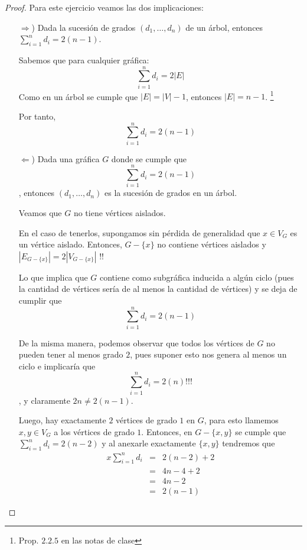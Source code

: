 \documentclass{article}
\begin{document}
\begin{enumerate}
      \renewcommand\qedsymbol{QED}
      \begin{proof}
        Para este ejercicio veamos las dos implicaciones:
        \begin{itemize}
          \item[$\Rightarrow$)] Dada la sucesi\'on de grados $(d_1, \dots, d_n)$ de un
            \'arbol, entonces $\displaystyle \sum_{i=1}^n d_i = 2(n-1)$.

            Sabemos que para cualquier gr\'afica:
            \[
            \sum_{i=1}^n d_i = 2|E|
            \]
            Como en un \'arbol se cumple que $|E| = |V| - 1$, entonces $|E| = n - 1$. \footnote{Prop. $2.2.5$ en las
            notas de clase}

            Por tanto,
            \[
            \sum_{i=1}^n d_i = 2(n - 1)
            \]

          \item[$\Leftarrow$)] Dada una gr\'afica $G$ donde se cumple que
            $$\displaystyle \sum_{i=1}^n d_i = 2(n-1)$$
            , entonces $(d_1, \dots, d_n)$ es la sucesi\'on de grados en un \'arbol.

            Veamos que $G$ no tiene v\'ertices aislados.

            En el caso de tenerlos, supongamos sin p\'erdida de generalidad que
            $x \in V_G$ es un v\'ertice aislado. Entonces, $G - \{x\}$ no contiene
            v\'ertices aislados
            y $|E_{G - \{x\}}| = 2|V_{G - \{x\}}|$ !!

            Lo que implica que $G$ contiene como subgr\'afica inducida a alg\'un
            ciclo (pues la cantidad de v\'ertices ser\'ia de al menos la cantidad
            de v\'ertices) y se deja de cumplir que
            $$\displaystyle \sum_{i=1}^n d_i = 2(n-1)$$

            De la misma manera, podemos observar que todos los v\'ertices
            de $G$ no pueden tener al menos grado $2$, pues suponer esto nos genera
            al menos un ciclo e implicar\'ia que
            $$\displaystyle \sum_{i=1}^n d_i = 2(n) \text{!!!}$$
            , y claramente $2n \not= 2(n - 1)$.

            Luego, hay exactamente $2$ v\'ertices de grado $1$ en $G$, para esto
            llamemos $x, y \in V_G$ a los v\'ertices de grado $1$. Entonces, en
            $G -\{x, y\}$ se cumple que $\displaystyle \sum_{i=1}^n d_i = 2(n-2)$
            y al anexarle exactamente $\{x, y\}$ tendremos que
            \begin{eqnarray*}x
              \sum_{i=1}^n d_i &=& 2(n-2) + 2\\
              &=& 4n - 4 + 2\\
              &=& 4n - 2\\
              &=& 2(n - 1)
            \end{eqnarray*}


\end{itemize}
\end{proof}
\end{enumerate}
\end{document}
